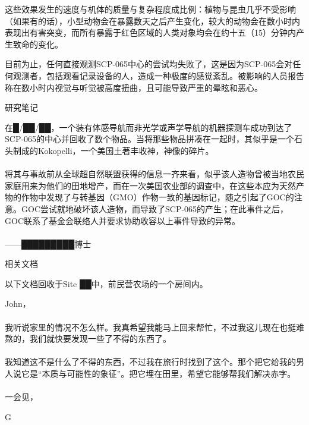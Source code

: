 这些效果发生的速度与机体的质量与复杂程度成比例：植物与昆虫几乎不受影响（如果有的话），小型动物会在暴露数天之后产生变化，较大的动物会在数小时内表现出有害突变，而所有暴露于红色区域的人类对象均会在约十五（15）分钟内产生致命的变化。

目前为止，任何直接观测SCP-065中心的尝试均失败了，这是因为SCP-065会对任何观测者，包括观看记录设备的人，造成一种极度的感觉紊乱。被影响的人员报告称在数小时内视觉与听觉被高度扭曲，且可能导致严重的晕眩和恶心。

研究笔记

\begin{scpbox}

在█\slash ██\slash ██，一个装有体感导航而非光学或声学导航的机器探测车成功到达了SCP-065的中心并回收了数个物品。当将那些物品拼凑在一起时，其似乎是一个石头制成的Kokopelli，一个美国土著丰收神，神像的碎片。\\
\\
将其与事故前从全球超自然联盟获得的信息一齐来看，似乎该人造物曾被当地农民家庭用来为他们的田地增产，而在一次美国农业部的调查中，在这些本应为天然产物的作物中发现了与转基因（GMO）作物一致的基因标记，随之引起了GOC的注意。GOC尝试就地破坏该人造物，而导致了SCP-065的产生；在此事件之后，GOC联系了基金会联络人并要求协助收容以上事件导致的异常。\\
\\
——█████████博士

\end{scpbox}

相关文档

以下文档回收于Site ██中，前民营农场的一个房间内。

\begin{scpbox}

John，\\
\\
我听说家里的情况不怎么样。我真希望我能马上回来帮忙，不过我这儿现在也挺难熬的，我们就快要发现一些了不得的东西了。\\
\\
我知道这不是什么了不得的东西，不过我在旅行时找到了这个。那个把它给我的男人说它是“本质与可能性的象征”。把它埋在田里，希望它能够帮我们解决赤字。\\
\\
一会见，

G

\end{scpbox}
